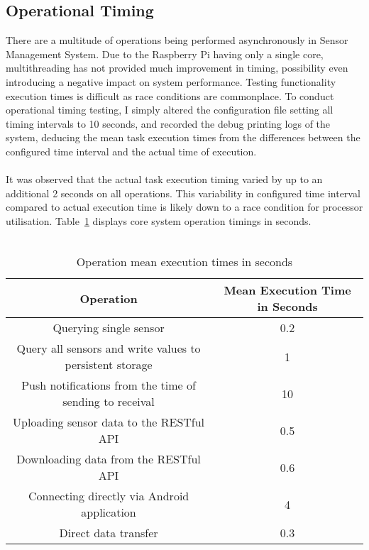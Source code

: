 \documentclass{article}
\begin{document}
\subsection{Operational Timing}
There are a multitude of operations being performed asynchronously in Sensor Management System. Due to the Raspberry Pi having only a single core, multithreading has not provided much improvement in timing, possibility even introducing a negative impact on system performance. Testing functionality execution times is difficult as race conditions are commonplace. To conduct operational timing testing, I simply altered the configuration file setting all timing intervals to 10 seconds, and recorded the debug printing logs of the system, deducing the mean task execution times from the differences between the configured time interval and the actual time of execution. \\\\
It was observed that the actual task execution timing varied by up to an additional 2 seconds on all operations. This variability in configured time interval compared to actual execution time is likely down to a race condition for processor utilisation. Table~\ref{table:testing_op_timings} displays core system operation timings in seconds. \\\\

\begin{table}[H]
\def\arraystretch{2}%
\begin{center}
 \begin{tabular}{|| c | c ||} 
 \hline
 \textbf{Operation} & \textbf{Mean Execution Time in Seconds}  \\ [0.5ex] 
 \hline\hline
 Querying single sensor & 0.2 \\ 
 \hline
 Query all sensors and write values to persistent storage & 1 \\
 \hline
 Push notifications from the time of sending to receival & 10 \\
 \hline
 Uploading sensor data to the RESTful API & 0.5 \\ [1ex] 
 \hline
 Downloading data from the RESTful API & 0.6 \\ [1ex] 
 \hline
 Connecting directly via Android application & 4 \\ [1ex] 
 \hline
 Direct data transfer & 0.3 \\ [1ex] 
 \hline
 
\end{tabular}
\end{center}
\caption{Operation mean execution times in seconds}
\label{table:testing_op_timings}
\end{table}
\end{document}
